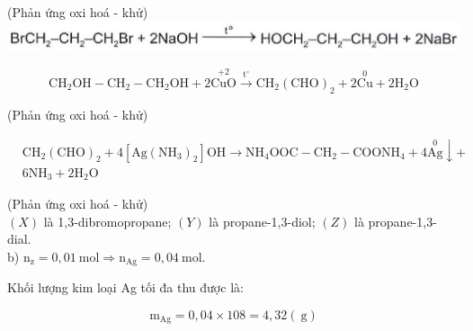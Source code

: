 \documentclass[10pt]{article}
\begin{document}
(Phản ứng oxi hoá - khử)\\
\includegraphics[max width=\textwidth, center]{2025_10_23_adad5b98d65ac6665838g-44}

$$
\mathrm{CH}_{2} \mathrm{OH}-\mathrm{CH}_{2}-\mathrm{CH}_{2} \mathrm{OH}+2 \stackrel{+2}{\mathrm{CuO}} \xrightarrow{\mathrm{t}^{\circ}} \mathrm{CH}_{2}(\mathrm{CHO})_{2}+2 \stackrel{0}{\mathrm{Cu}}+2 \mathrm{H}_{2} \mathrm{O}
$$

(Phản ứng oxi hoá - khử)

$$
\begin{aligned}
& \mathrm{CH}_{2}(\mathrm{CHO})_{2}+4\left[\mathrm{Ag}\left(\mathrm{NH}_{3}\right)_{2}\right] \mathrm{OH} \rightarrow \mathrm{NH}_{4} \mathrm{OOC}-\mathrm{CH}_{2}-\mathrm{COONH}_{4}+4 \stackrel{0}{\mathrm{Ag}} \downarrow+ \\
& 6 \mathrm{NH}_{3}+2 \mathrm{H}_{2} \mathrm{O}
\end{aligned}
$$

(Phản ứng oxi hoá - khử)\\
$(X)$ là 1,3-dibromopropane; $(Y)$ là propane-1,3-diol; $(Z)$ là propane-1,3-dial.\\
b) $\mathrm{n}_{\mathrm{z}}=0,01 \mathrm{~mol} \Rightarrow \mathrm{n}_{\mathrm{Ag}}=0,04 \mathrm{~mol}$.

Khối lượng kim loại Ag tối đa thu được là:

$$
\mathrm{m}_{\mathrm{Ag}}=0,04 \times 108=4,32(\mathrm{~g})
$$
\end{document}
